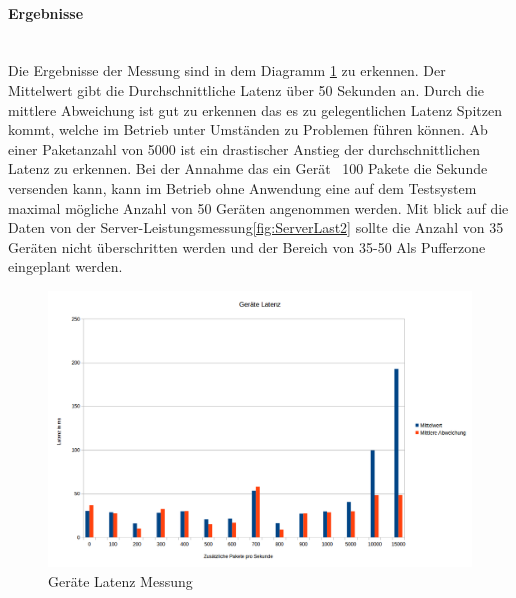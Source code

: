 \documentclass[a4paper]{spie}  %
\begin{document}
\begin{minipage}[t]{0.4\textwidth}
\vspace{0pt}

\paragraph{Ergebnisse}\mbox{}\\
Die Ergebnisse der Messung sind in dem Diagramm \ref{fig:LatenzMessung} zu erkennen. Der Mittelwert gibt die Durchschnittliche Latenz über 50 Sekunden an. Durch die mittlere Abweichung ist gut zu erkennen das es zu gelegentlichen Latenz Spitzen kommt, welche im Betrieb unter Umständen zu Problemen führen können. Ab einer Paketanzahl von 5000 ist ein drastischer Anstieg der durchschnittlichen Latenz zu erkennen. Bei der Annahme das ein Gerät ~100 Pakete die Sekunde versenden kann, kann im Betrieb ohne Anwendung eine auf dem Testsystem maximal mögliche Anzahl von 50 Geräten angenommen werden. Mit blick auf die Daten von der Server-Leistungsmessung\ref{fig:ServerLast2} sollte die Anzahl von 35 Geräten nicht überschritten werden und der Bereich von 35-50 Als Pufferzone eingeplant werden.

\end{minipage}
\hfill
\begin{minipage}[t]{0.5\textwidth}
	\begin{figure}[H]
	\vspace{0pt}
		\centering
		\centering
		\includegraphics[width=1\textwidth]{./images/LatenzMessung.png}
		\caption{Geräte Latenz Messung}
		\label{fig:LatenzMessung}
	\end{figure}	
\end{minipage}
\end{document}
